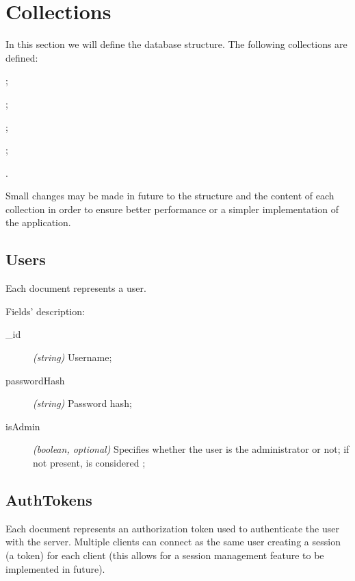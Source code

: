 \section{Collections}\label{sec:collections}

In this section we will define the database structure. The following collections
are defined:
\begin{enumerate*}[label=]
	\item {};
	\item {};
	\item {};
	\item {};
	\item {}.
\end{enumerate*}

Small changes may be made in future to the structure and the content of each
collection in order to ensure better performance or a simpler implementation of
the application.

\subsection{Users}

Each document represents a user.



Fields' description:
\begin{description}
	\item[\_id] \textit{(string)} Username;
	\item[passwordHash] \textit{(string)} Password hash;
	\item[isAdmin] \textit{(boolean, optional)} Specifies whether the user
		is the administrator or not; if not present, is considered
		;
\end{description}

\subsection{AuthTokens}

Each document represents an authorization token used to authenticate the user
with the server. Multiple clients can connect as the same user creating a
session (a token) for each client (this allows for a session management feature
to be implemented in future).



